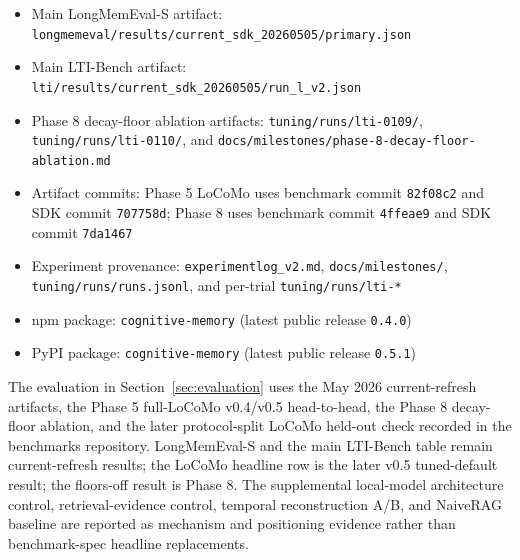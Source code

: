 \documentclass[11pt,a4paper]{article}
\begin{document}
\begin{itemize}
    \item Main LongMemEval-S artifact: \texttt{longmemeval/results/current\_sdk\_20260505/primary.json}
    \item Main LTI-Bench artifact: \texttt{lti/results/current\_sdk\_20260505/run\_l\_v2.json}
    \item Phase 8 decay-floor ablation artifacts: \texttt{tuning/runs/lti-0109/}, \texttt{tuning/runs/lti-0110/}, and \texttt{docs/milestones/phase-8-decay-floor-ablation.md}
    \item Artifact commits: Phase 5 LoCoMo uses benchmark commit \texttt{82f08c2} and SDK commit \texttt{707758d}; Phase 8 uses benchmark commit \texttt{4ffeae9} and SDK commit \texttt{7da1467}
    \item Experiment provenance: \texttt{experimentlog\_v2.md}, \texttt{docs/milestones/}, \texttt{tuning/runs/runs.jsonl}, and per-trial \texttt{tuning/runs/lti-*}
    \item npm package: \texttt{cognitive-memory} (latest public release \texttt{0.4.0})
    \item PyPI package: \texttt{cognitive-memory} (latest public release \texttt{0.5.1})
\end{itemize}

The evaluation in Section~\ref{sec:evaluation} uses the May 2026 current-refresh artifacts, the Phase 5 full-LoCoMo v0.4/v0.5 head-to-head, the Phase 8 decay-floor ablation, and the later protocol-split LoCoMo held-out check recorded in the benchmarks repository. LongMemEval-S and the main LTI-Bench table remain current-refresh results; the LoCoMo headline row is the later v0.5 tuned-default result; the floors-off result is Phase 8. The supplemental local-model architecture control, retrieval-evidence control, temporal reconstruction A/B, and NaiveRAG baseline are reported as mechanism and positioning evidence rather than benchmark-spec headline replacements.



\end{document}
